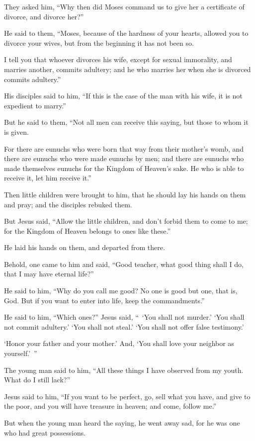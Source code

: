 They asked him, “Why then did Moses command us to give her a certificate of divorce, and divorce her?”

He said to them, “Moses, because of the hardness of your hearts, allowed you to divorce your wives, but from the beginning it has not been so.

I tell you that whoever divorces his wife, except for sexual immorality, and marries another, commits adultery; and he who marries her when she is divorced commits adultery.”

His disciples said to him, “If this is the case of the man with his wife, it is not expedient to marry.”

But he said to them, “Not all men can receive this saying, but those to whom it is given.

For there are eunuchs who were born that way from their mother’s womb, and there are eunuchs who were made eunuchs by men; and there are eunuchs who made themselves eunuchs for the Kingdom of Heaven’s sake. He who is able to receive it, let him receive it.”

Then little children were brought to him, that he should lay his hands on them and pray; and the disciples rebuked them.

But Jesus said, “Allow the little children, and don’t forbid them to come to me; for the Kingdom of Heaven belongs to ones like these.”

He laid his hands on them, and departed from there.

Behold, one came to him and said, “Good teacher, what good thing shall I do, that I may have eternal life?”

He said to him, “Why do you call me good? No one is good but one, that is, God. But if you want to enter into life, keep the commandments.”

He said to him, “Which ones?” Jesus said, “ ‘You shall not murder.’ ‘You shall not commit adultery.’ ‘You shall not steal.’ ‘You shall not offer false testimony.’

‘Honor your father and your mother.’ And, ‘You shall love your neighbor as yourself.’ ”

The young man said to him, “All these things I have observed from my youth. What do I still lack?”

Jesus said to him, “If you want to be perfect, go, sell what you have, and give to the poor, and you will have treasure in heaven; and come, follow me.”

But when the young man heard the saying, he went away sad, for he was one who had great possessions.

